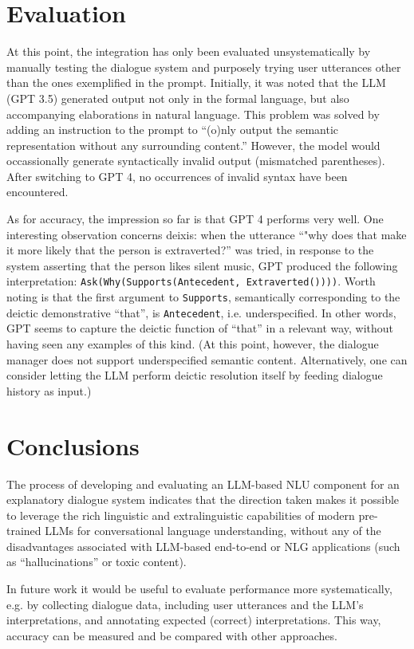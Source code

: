 \documentclass[11pt]{article}
\begin{document}
\section{Evaluation}
\label{sec:evaluation}
At this point, the integration has only been evaluated unsystematically by manually testing the dialogue system and purposely trying user utterances other than the ones exemplified in the prompt. Initially, it was noted that the LLM (GPT 3.5) generated output not only in the formal language, but also accompanying elaborations in natural language. This problem was solved by adding an instruction to the prompt to ``(o)nly output the semantic representation without any surrounding content.'' However, the model would occassionally generate syntactically invalid output (mismatched parentheses). After switching to GPT 4, no occurrences of invalid syntax have been encountered.

As for accuracy, the impression so far is that GPT 4 performs very well. One interesting observation concerns deixis: when the utterance ``"why does that make it more likely that the person is extraverted?'' was tried, in response to the system asserting that the person likes silent music, GPT produced the following interpretation: \texttt{Ask(Why(Supports(Antecedent, Extraverted())))}. Worth noting is that the first argument to \texttt{Supports}, semantically corresponding to the deictic demonstrative ``that'', is \texttt{Antecedent}, i.e. underspecified. In other words, GPT seems to capture the deictic function of ``that'' in a relevant way, without having seen any examples of this kind. (At this point, however, the dialogue manager does not support underspecified semantic content. Alternatively, one can consider letting the LLM perform deictic resolution itself by feeding dialogue history as input.)

\section{Conclusions}
The process of developing and evaluating an LLM-based NLU component for an explanatory dialogue system indicates that the direction taken makes it possible to leverage the rich linguistic and extralinguistic capabilities of modern pre-trained LLMs for conversational language understanding, without any of the disadvantages associated with LLM-based end-to-end or NLG applications (such as ``hallucinations'' or toxic content).

In future work it would be useful to evaluate performance more systematically, e.g. by collecting dialogue data, including user utterances and the LLM's interpretations, and annotating expected (correct) interpretations. This way, accuracy can be measured and be compared with other approaches.
\end{document}
